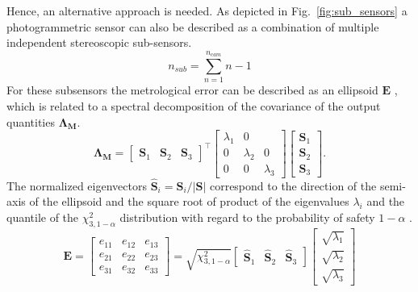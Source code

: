 \documentclass[5p,times,procedia]{elsarticle}
\begin{document}
%
Hence, an alternative approach is needed. As depicted in  Fig.~\ref{fig:sub_sensors} a photogrammetric sensor can also be described as a combination of multiple independent stereoscopic sub-sensors.
%
\begin{equation}
	\label{eqn:CovarianceMatrix}
	n_{sub} = \sum_{n=1}^{n_{cam}}n-1
\end{equation}
%
For these subsensors the metrological error can be described as an ellipsoid $\mathbf{E}$ \cite{Luhmann2003}, which is related to a spectral decomposition of the covariance of the output quantities $\mathbf{\Lambda_{M}}$.
%
\begin{equation}
	\mathbf{\Lambda_{M}} =
	\begin{bmatrix}
		\mathbf{S}_1^{} & \mathbf{S}_2^{} & \mathbf{S}_3^{}
	\end{bmatrix}^{\top}
	\begin{bmatrix}
		\lambda_1^{} & 0 \\
		0 & \lambda_2^{} &  0 \\
		0 & 0 &  \lambda_3^{}
	\end{bmatrix}
	\begin{bmatrix}
		\mathbf{S}_1^{} \\
		\mathbf{S}_2^{} \\
		\mathbf{S}_3^{}
	\end{bmatrix}.
\end{equation}
%
The normalized eigenvectors $\mathbf{\hat{S}}_i = \mathbf{S}_i / |\mathbf{S}|$ correspond to the direction of the semi-axis of the ellipsoid and the square root of product of the eigenvalues $\lambda_i$ and the quantile of the $\chi^2_{3,1-\alpha} $ distribution with regard to the probability of safety $1-\alpha$ \cite{Pelzer1995}.
%
\begin{equation}
	\mathbf{E} =
	\begin{bmatrix}
		e_{11}^{} & e_{12}^{} & e_{13}^{} \\
		e_{21}^{} & e_{22}^{} & e_{23}^{} \\
		e_{31}^{} & e_{32}^{} & e_{33}^{}
	\end{bmatrix}
	=
	\sqrt{ \chi^2_{3,1-\alpha}}
	\begin{bmatrix}
		\mathbf{\hat{S}}_1^{} & \mathbf{\hat{S}}_2^{} & \mathbf{\hat{S}}_3^{}
	\end{bmatrix}
	\begin{bmatrix}
		\sqrt{\lambda_1^{}} \\
		\sqrt{\lambda_2^{}} \\
		\sqrt{\lambda_3^{}}
	\end{bmatrix}
\end{equation}
\end{document}

